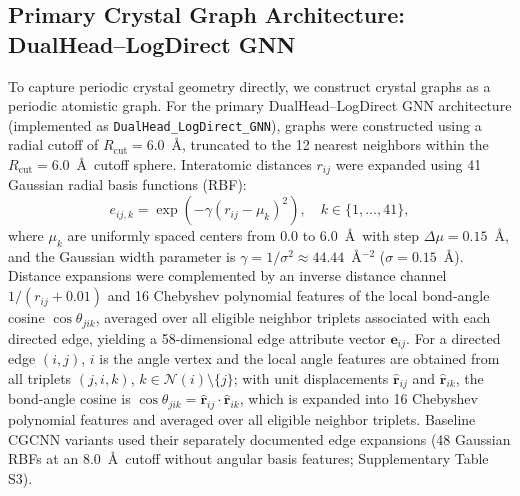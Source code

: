 \documentclass[journal,article,submit,moreauthors,pdftex]{article}
\begin{document}
\subsection{Primary Crystal Graph Architecture: DualHead--LogDirect GNN}
To capture periodic crystal geometry directly, we construct crystal graphs as a periodic atomistic graph. For the primary DualHead--LogDirect GNN architecture (implemented as \texttt{DualHead\_LogDirect\_GNN}), graphs were constructed using a radial cutoff of $R_{\mathrm{cut}} = 6.0$~\AA, truncated to the 12 nearest neighbors within the $R_{\mathrm{cut}} = 6.0$~\AA\ cutoff sphere. Interatomic distances $r_{ij}$ were expanded using 41 Gaussian radial basis functions (RBF):
\begin{equation}
    e_{ij, k} = \exp\left(-\gamma (r_{ij} - \mu_k)^2\right), \quad k \in \{1, \dots, 41\},
\end{equation}
where $\mu_k$ are uniformly spaced centers from $0.0$ to $6.0$~\AA\ with step $\Delta\mu = 0.15$~\AA, and the Gaussian width parameter is $\gamma = 1/\sigma^2 \approx 44.44$~\AA$^{-2}$ ($\sigma = 0.15$~\AA). Distance expansions were complemented by an inverse distance channel $1/(r_{ij} + 0.01)$ and 16 Chebyshev polynomial features of the local bond-angle cosine $\cos\theta_{jik}$, averaged over all eligible neighbor triplets associated with each directed edge, yielding a 58-dimensional edge attribute vector $\mathbf{e}_{ij}$. For a directed edge $(i, j)$, $i$ is the angle vertex and the local angle features are obtained from all triplets $(j, i, k)$, $k \in \mathcal{N}(i) \setminus \{j\}$; with unit displacements $\hat{\mathbf{r}}_{ij}$ and $\hat{\mathbf{r}}_{ik}$, the bond-angle cosine is $\cos\theta_{jik} = \hat{\mathbf{r}}_{ij} \cdot \hat{\mathbf{r}}_{ik}$, which is expanded into 16 Chebyshev polynomial features and averaged over all eligible neighbor triplets. Baseline CGCNN variants used their separately documented edge expansions (48 Gaussian RBFs at an $8.0$~\AA\ cutoff without angular basis features; Supplementary Table S3).
\end{document}
